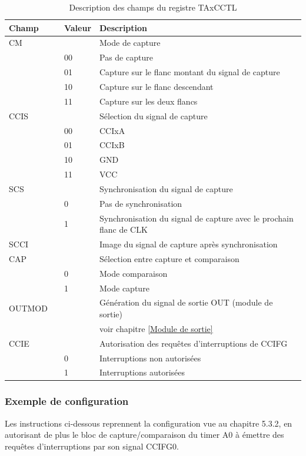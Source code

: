 \begin{table}[H]
\centering 
\begin{tabular}{l l l l}
\hline\hline
Champ & & Valeur & Description \\ %
\hline
CM & & & Mode de capture  \\
& & 00 & Pas de capture  \\
& & 01 & Capture sur le flanc montant du signal de capture  \\
& & 10 & Capture sur le flanc descendant  \\
& & 11 & Capture sur les deux flancs  \\
\hline
CCIS & & & Sélection du signal de capture  \\
& & 00 & CCIxA  \\
& & 01 & CCIxB  \\
& & 10 & GND  \\
& & 11 & VCC  \\
\hline
SCS & & & Synchronisation du signal de capture  \\
& & 0 & Pas de synchronisation \\
& & 1 & Synchronisation du signal de capture avec le prochain flanc de CLK \\
\hline
SCCI & & & Image du signal de capture après synchronisation \\
\hline
CAP & & & Sélection entre capture et comparaison \\
& & 0 & Mode comparaison \\
& & 1 & Mode capture \\
\hline
OUTMOD & & & Génération du signal de sortie OUT (module de sortie) \\
& & &  voir chapitre \ref{Module de sortie} \\ 
\hline
CCIE & & & Autorisation des requêtes d'interruptions de CCIFG \\
& & 0 & Interruptions non autorisées \\
& & 1 & Interruptions autorisées \\
\hline
\end{tabular}
\caption{Description des champs du registre TAxCCTL}
\label{table:TAxCCTL}
\end{table}

\subsubsection*{Exemple de configuration}
Les instructions ci-dessous reprennent la configuration vue au chapitre 5.3.2, en autorisant de plus le bloc de capture/comparaison du timer A0 à émettre des requêtes d'interruptions par son signal CCIFG0.

